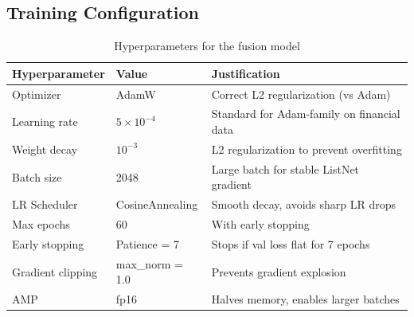 \documentclass[12pt,a4paper]{article}
\begin{document}
\subsection{Training Configuration}

\begin{table}[H]
\centering
\caption{Hyperparameters for the fusion model}
\begin{tabular}{lll}
\toprule
\textbf{Hyperparameter} & \textbf{Value} & \textbf{Justification} \\
\midrule
Optimizer         & AdamW            & Correct L2 regularization (vs Adam) \\
Learning rate     & $5 \times 10^{-4}$ & Standard for Adam-family on financial data \\
Weight decay      & $10^{-3}$        & L2 regularization to prevent overfitting \\
Batch size        & 2048             & Large batch for stable ListNet gradient \\
LR Scheduler      & CosineAnnealing  & Smooth decay, avoids sharp LR drops \\
Max epochs        & 60               & With early stopping \\
Early stopping    & Patience = 7     & Stops if val loss flat for 7 epochs \\
Gradient clipping & max\_norm = 1.0  & Prevents gradient explosion \\
AMP               & fp16             & Halves memory, enables larger batches \\
\bottomrule
\end{tabular}
\end{table}
\end{document}
